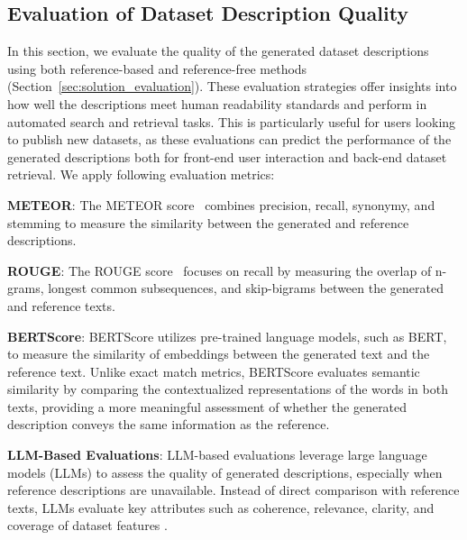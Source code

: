 \vspace{-.2cm}
\subsection{Evaluation of Dataset Description Quality}


In this section, we evaluate the quality of the generated dataset descriptions using both reference-based and reference-free methods (Section~\ref{sec:solution_evaluation}). These evaluation strategies offer insights into how well the descriptions meet human readability standards and perform in automated search and retrieval tasks. This is particularly useful for users looking to publish new datasets, as these evaluations can predict the performance of the generated descriptions both for front-end user interaction and back-end dataset retrieval. We apply following evaluation metrics:

\noindent \textbf{METEOR}: The METEOR score~\cite{banerjee2005meteor} combines precision, recall, synonymy, and stemming to measure the similarity between the generated and reference descriptions. 

\noindent \textbf{ROUGE}: The ROUGE score~\cite{lin2004rouge} focuses on recall by measuring the overlap of n-grams, longest common subsequences, and skip-bigrams between the generated and reference texts.


\noindent \textbf{BERTScore}: BERTScore \cite{zhang2019bertscore} utilizes pre-trained language models, such as BERT, to measure the similarity of embeddings between the generated text and the reference text. Unlike exact match metrics, BERTScore evaluates semantic similarity by comparing the contextualized representations of the words in both texts, providing a more meaningful assessment of whether the generated description conveys the same information as the reference.

\noindent \textbf{LLM-Based Evaluations}: LLM-based evaluations leverage large language models (LLMs) to assess the quality of generated descriptions, especially when reference descriptions are unavailable. Instead of direct comparison with reference texts, LLMs evaluate key attributes such as coherence, relevance, clarity, and coverage of dataset features \cite{liu2023geval, gao2024llmEval}. 

